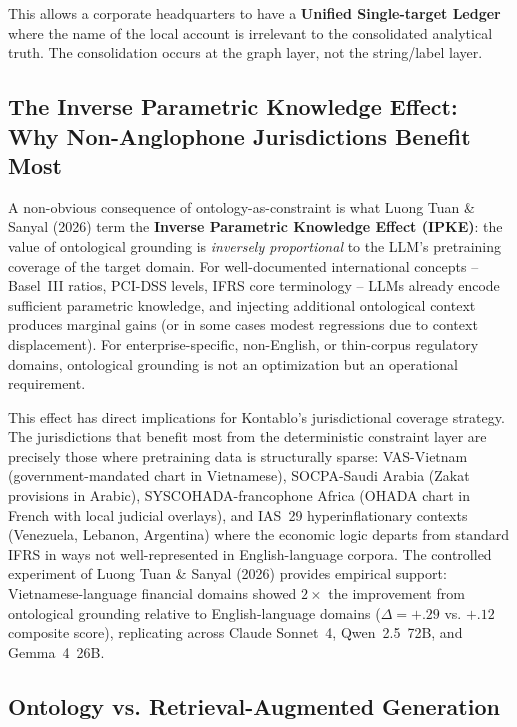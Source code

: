 This allows a corporate headquarters to have a \textbf{Unified Single-target Ledger} where the name of the local account is irrelevant to the consolidated analytical truth. The consolidation occurs at the graph layer, not the string/label layer.

\subsection{The Inverse Parametric Knowledge Effect: Why Non-Anglophone
Jurisdictions Benefit Most}
\label{subsec:ipke}

A non-obvious consequence of ontology-as-constraint is what Luong Tuan \&
Sanyal (2026) term the \textbf{Inverse Parametric Knowledge Effect (IPKE)}:
the value of ontological grounding is \emph{inversely proportional} to the
LLM's pretraining coverage of the target domain. For well-documented
international concepts -- Basel~III ratios, PCI-DSS levels, IFRS core
terminology -- LLMs already encode sufficient parametric knowledge, and
injecting additional ontological context produces marginal gains (or in
some cases modest regressions due to context displacement). For
enterprise-specific, non-English, or thin-corpus regulatory domains,
ontological grounding is not an optimization but an operational requirement.

This effect has direct implications for Kontablo's jurisdictional coverage
strategy. The jurisdictions that benefit most from the deterministic
constraint layer are precisely those where pretraining data is structurally
sparse: VAS-Vietnam (government-mandated chart in Vietnamese), SOCPA-Saudi
Arabia (Zakat provisions in Arabic), SYSCOHADA-francophone Africa (OHADA
chart in French with local judicial overlays), and IAS~29 hyperinflationary
contexts (Venezuela, Lebanon, Argentina) where the economic logic departs
from standard IFRS in ways not well-represented in English-language
corpora. The controlled experiment of Luong Tuan \& Sanyal (2026) provides
empirical support: Vietnamese-language financial domains showed $2\times$ the
improvement from ontological grounding relative to English-language domains
($\Delta = +.29$ vs. $+.12$ composite score), replicating across Claude
Sonnet~4, Qwen~2.5~72B, and Gemma~4~26B.

\subsection{Ontology vs. Retrieval-Augmented Generation}
\label{subsec:ontology_vs_rag}

